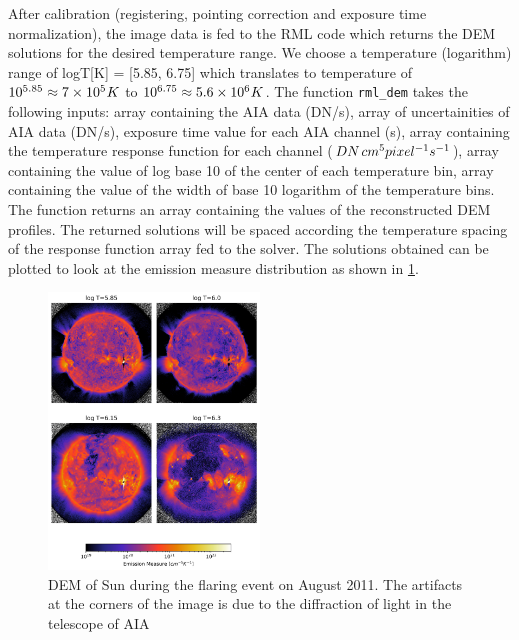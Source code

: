 After calibration (registering, pointing correction and exposure time normalization), the image data is fed to the RML code {\citep{Massa2023}} which returns the DEM solutions for the desired temperature range. We choose a temperature (logarithm) range of logT[K] = [5.85, 6.75] which translates to temperature of $10^{5.85} \approx 7 \times 10^5 \hspace{0.1mm} K$ to $10^{6.75} \approx 5.6 \times 10^6 \hspace{0.1mm} K$. The function \texttt{rml\_dem} takes the following inputs: array containing the AIA data (DN/s), array of uncertainities of AIA data (DN/s), exposure time value for each AIA channel (s), array containing the temperature response function for each channel ($ DN \hspace{0.5mm} cm^5 pixel^{-1} s^{-1}$), array containing the value of log base 10 of the center of each temperature bin, array containing the value of the width of base 10 logarithm of the temperature bins. The function returns an array containing the values of the reconstructed DEM profiles. The returned solutions will be spaced according the temperature spacing of the response function array fed to the solver. The solutions obtained can be plotted to look at the emission measure distribution as shown in \cref{fig:dem_img_aug_4_2011}.\\

\begin{figure}[h!]
    \centering
    \includegraphics[width=0.5\textwidth]{images/dem_img_aug_4_2011.png}
    \caption[DEM full disk image of Sun]{DEM of Sun during the flaring event on  August 2011. The artifacts at the corners of the image is due to the diffraction of light in the telescope of AIA}
    \label{fig:dem_img_aug_4_2011}
\end{figure}

